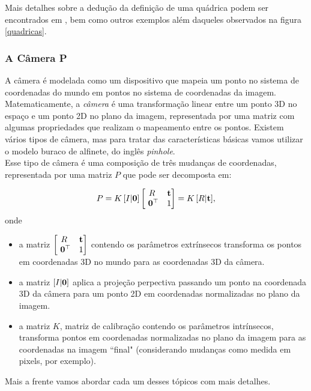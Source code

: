 Mais detalhes sobre a dedução da definição de uma quádrica podem ser encontrados em \cite{Hartley2004}, bem como outros exemplos além daqueles observados na figura \ref{quadricas}.

\subsubsection{A Câmera P}

A câmera é modelada como um dispositivo que mapeia um ponto no sistema de coordenadas do mundo em pontos no sistema de coordenadas da imagem. Matematicamente, a \textit{câmera} é uma transformação linear entre um ponto 3D no espaço e um ponto 2D no plano da imagem, representada por uma matriz com algumas propriedades que realizam o mapeamento entre os pontos. Existem vários tipos de câmera, mas para tratar das características básicas vamos utilizar o modelo buraco de alfinete, do inglês \textit{pinhole}.
\\
Esse tipo de câmera é uma composição de três mudanças de coordenadas, representada por uma matriz $P$ que pode ser decomposta em:

\begin{equation*}
P = K \, [I|{\bf 0}]
\begin{bmatrix}
R&{\bf t}\\
\,\,{\bf 0}^\top &1
\end{bmatrix}
= K\,[R|{\bf t}],
\end{equation*}
onde 

\begin{itemize}
\item a matriz $\begin{bmatrix}
R&{\bf t}\\
\,\,{\bf 0}^\top &1
\end{bmatrix}$
contendo os parâmetros extrínsecos transforma os pontos em coordenadas 3D no mundo para as coordenadas 3D da câmera.
\item a matriz $[I|{\bf 0}]$ aplica a projeção perpectiva passando um ponto na coordenada 3D da câmera para um ponto 2D em coordenadas normalizadas no plano da imagem.
\item a matriz $K$, matriz de calibração contendo os parâmetros intrínsecos, transforma pontos em coordenadas normalizadas no plano da imagem para as coordenadas na imagem ``final" (considerando mudanças como medida em pixels, por exemplo).  
\end{itemize}
Mais a frente vamos abordar cada um desses tópicos com mais detalhes.

